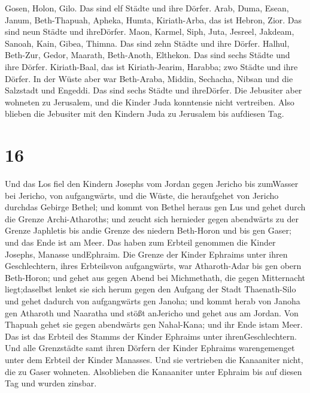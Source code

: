  Gosen, Holon, Gilo. Das sind elf Städte und ihre Dörfer.
 Arab, Duma, Esean,  Janum, Beth-Thapuah,
Apheka,  Humta, Kiriath-Arba, das ist Hebron, Zior. Das
sind neun Städte und ihreDörfer.  Maon, Karmel, Siph, Juta,
 Jesreel, Jakdeam, Sanoah,  Kain, Gibea,
Thimna. Das sind zehn Städte und ihre Dörfer.  Halhul,
Beth-Zur, Gedor,  Maarath, Beth-Anoth, Elthekon. Das sind
sechs Städte und ihre Dörfer.  Kiriath-Baal, das ist
Kiriath-Jearim, Harabba; zwo Städte und ihre Dörfer.  In
der Wüste aber war Beth-Araba, Middin, Sechacha,  Nibsan
und die Salzstadt und Engeddi. Das sind sechs Städte und ihreDörfer.
 Die Jebusiter aber wohneten zu Jerusalem, und die Kinder
Juda konntensie nicht vertreiben. Also blieben die Jebusiter mit den
Kindern Juda zu Jerusalem bis aufdiesen Tag.

\hypertarget{section-15}{%
\section{16}\label{section-15}}

 Und das Los fiel den Kindern Josephs vom Jordan gegen
Jericho bis zumWasser bei Jericho, von aufgangwärts, und die Wüste, die
heraufgehet von Jericho durchdas Gebirge Bethel;  und kommt
von Bethel heraus gen Lus und gehet durch die Grenze Archi-Atharoths;
 und zeucht sich hernieder gegen abendwärts zu der Grenze
Japhletis bis andie Grenze des niedern Beth-Horon und bis gen Gaser; und
das Ende ist am Meer.  Das haben zum Erbteil genommen die
Kinder Josephs, Manasse undEphraim.  Die Grenze der Kinder
Ephraims unter ihren Geschlechtern, ihres Erbteilsvon aufgangwärts, war
Atharoth-Adar bis gen obern Beth-Horon;  und gehet aus gegen
Abend bei Michmethath, die gegen Mitternacht liegt;daselbst lenket sie
sich herum gegen den Aufgang der Stadt Thaenath-Silo und gehet dadurch
von aufgangwärts gen Janoha;  und kommt herab von Janoha gen
Atharoth und Naaratha und stößt anJericho und gehet aus am Jordan.
 Von Thapuah gehet sie gegen abendwärts gen Nahal-Kana; und
ihr Ende istam Meer. Das ist das Erbteil des Stamms der Kinder Ephraims
unter ihrenGeschlechtern.  Und alle Grenzstädte samt ihren
Dörfern der Kinder Ephraims warengemenget unter dem Erbteil der Kinder
Manasses.  Und sie vertrieben die Kanaaniter nicht, die zu
Gaser wohneten. Alsoblieben die Kanaaniter unter Ephraim bis auf diesen
Tag und wurden zinsbar.

